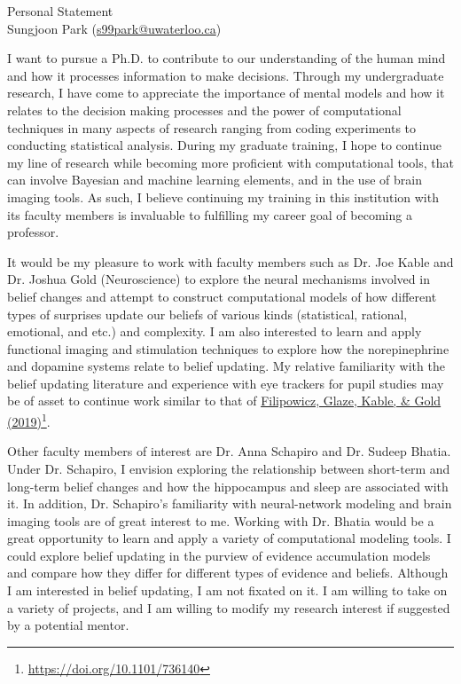 \documentclass[12pt]{article}
\let\oldcenter\center
\let\oldendcenter\endcenter
\renewenvironment{center}{\setlength\topsep{-1pt}\oldcenter}{\oldendcenter}
\begin{document}
\begin{center}
{\Large Personal Statement} \\
{\normalsize Sungjoon Park (\href{mailto:s99park@uwaterloo.ca}{s99park@uwaterloo.ca})}
\end{center}

I want to pursue a Ph.D. to contribute to our understanding of the human mind and how it processes information to make decisions. Through my undergraduate research, I have come to appreciate the importance of mental models and how it relates to the decision making processes and the power of computational techniques in many aspects of research ranging from coding experiments to conducting statistical analysis. During my graduate training, I hope to continue my line of research while becoming more proficient with computational tools, that can involve Bayesian and machine learning elements, and in the use of brain imaging tools. As such, I believe continuing my training in this institution with its faculty members is invaluable to fulfilling my career goal of becoming a professor.

It would be my pleasure to work with faculty members such as Dr. Joe Kable and Dr. Joshua Gold (Neuroscience) to explore the neural mechanisms involved in belief changes and attempt to construct computational models of how different types of surprises update our beliefs of various kinds (statistical, rational, emotional, and etc.) and complexity. I am also interested to learn and apply functional imaging and stimulation techniques to explore how the norepinephrine and dopamine systems relate to belief updating. My relative familiarity with the belief updating literature and experience with eye trackers for pupil studies may be of asset to continue work similar to that of \href{https://doi.org/10.1101/736140 }{Filipowicz, Glaze, Kable, \& Gold (2019)}\footnote{\url{https://doi.org/10.1101/736140}}.

Other faculty members of interest are Dr. Anna Schapiro and Dr. Sudeep Bhatia. Under Dr. Schapiro, I envision exploring the relationship between short-term and long-term belief changes and how the hippocampus and sleep are associated with it. In addition, Dr. Schapiro's familiarity with neural-network modeling and brain imaging tools are of great interest to me. Working with Dr. Bhatia would be a great opportunity to learn and apply a variety of computational modeling tools. I could explore belief updating in the purview of evidence accumulation models and compare how they differ for different types of evidence and beliefs. Although I am interested in belief updating, I am not fixated on it. I am willing to take on a variety of projects, and I am willing to modify my research interest if suggested by a potential mentor.
\end{document}
